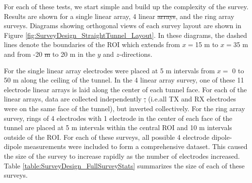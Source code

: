 \documentclass[preprint,authoryear,12pt]{elsarticle}
\providecommand{\DIFaddtex}[1]{{\protect\color{blue}\uwave{#1}}} %
\providecommand{\DIFdeltex}[1]{{\protect\color{red}\sout{#1}}}                      %
\providecommand{\DIFaddbegin}{} %
\providecommand{\DIFaddend}{} %
\providecommand{\DIFdelbegin}{} %
\providecommand{\DIFdelend}{} %
\providecommand{\DIFadd}[1]{\texorpdfstring{\DIFaddtex{#1}}{#1}} %
\providecommand{\DIFdel}[1]{\texorpdfstring{\DIFdeltex{#1}}{}} %
\begin{document}
For each of these tests, we start simple and build up the complexity of the survey. Results are shown for a single linear array, 4 linear \DIFdelbegin \DIFdel{arrays}\DIFdelend \DIFaddbegin \DIFadd{array}\DIFaddend , and the ring array surveys. Diagrams showing orthogonal views of each survey layout are shown in Figure \ref{fig:SurveyDesign_StraightTunnel_Layout}. In these diagrams, the dashed lines denote the boundaries of the ROI which extends from \DIFdelbegin \DIFdel{$x=$}\DIFdelend \DIFaddbegin \DIFadd{$x$ = }\DIFaddend 15 m to \DIFdelbegin \DIFdel{$x=$}\DIFdelend \DIFaddbegin \DIFadd{$x$ = }\DIFaddend 35 m and from -20 \DIFdelbegin \DIFdel{m }\DIFdelend to 20 m in the $y$ and $z$-directions\DIFaddbegin \DIFadd{, respectively}\DIFaddend .

For the single linear array electrodes were placed at 5 m intervals from \DIFdelbegin \DIFdel{$x=$ }\DIFdelend \DIFaddbegin \DIFadd{$x$ = }\DIFaddend 0 to 50 m along the ceiling of the tunnel. In the 4 linear array survey, one of these 11 electrode linear arrays is laid along the center of each tunnel face. For each of the linear arrays, data are collected independently \DIFdelbegin \DIFdel{, }\DIFdelend (i.e.\DIFaddbegin \DIFadd{, }\DIFaddend all TX and RX electrodes were on the same face of the tunnel), but inverted collectively. For the ring array survey, rings of 4 electrodes with 1 electrode in the center of each face of the tunnel are placed at 5 m intervals within the central ROI and 10 m intervals outside of the ROI. For each of these surveys, all possible 4 electrode dipole-dipole measurements were included to form a comprehensive dataset. This caused the size of the survey to increase rapidly as the number of electrodes increased. Table \ref{table:SurveyDesign_FullSurveyStats} summarizes the size of each of these surveys.
\end{document}
